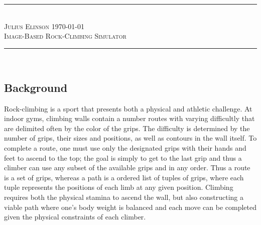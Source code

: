 \documentclass[pdftex,12pt]{article}
\newcommand{\horbar}{\rule{\linewidth}{0.4mm}}
\theoremstyle{definition}
\theoremstyle{remark}
\begin{document}
\begin{center}
\horbar \\
\textsc{Julius Elinson} \hfill \textsc{\today}\\[.1cm]
\textsc{\Large{Image-Based Rock-Climbing Simulator}}\\[-.1cm]
\horbar \\[.4cm]
\end{center}

\subsection*{Background}
Rock-climbing is a sport that presents both a physical and athletic challenge. At indoor gyms, climbing walls contain a number routes with varying difficultly that are delimited often by the color of the grips. The difficulty is determined by the number of grips, their sizes and positions, as well as contours in the wall itself. To complete a route, one must use only the designated grips with their hands and feet to ascend to the top; the goal is simply to get to the last grip and thus a climber can use any subset of the available grips and in any order. Thus a route is a set of grips, whereas a path is a ordered list of tuples of grips, where each tuple represents the positions of each limb at any given position. Climbing requires both the physical stamina to ascend the wall, but also constructing a viable path where one's body weight is balanced and each move can be completed given the physical constraints of each climber.
\end{document}
